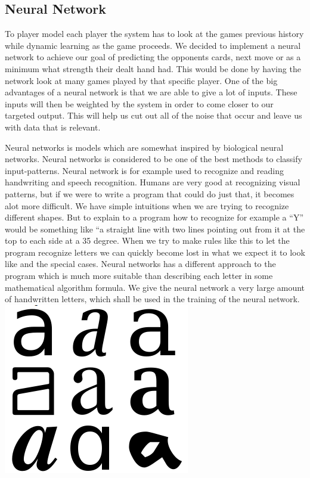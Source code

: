 \subsection{Neural Network}
To player model each player the system has to look at the games previous history while dynamic learning as the game proceeds.
We decided to implement a neural network to achieve our goal of predicting the opponents cards, next move or as a minimum what strength their dealt hand had. This would be done by having the network look at many games played by that specific player.
One of the big advantages of a neural network is that we are able to give a lot of inputs. These inputs will then be weighted by the system in order to come closer to our targeted output.
This will help us cut out all of the noise that occur and leave us with data that is relevant.

Neural networks is models which are somewhat inspired by biological neural networks. Neural networks is considered to be one of the best methods to classify input-patterns. Neural network is for example used to recognize and reading handwriting and speech recognition.
Humans are very good at recognizing visual patterns, but if we were to write a program that could do just that, it becomes alot more difficult. We have simple intuitions when we are trying to recognize different shapes. But to explain to a program how to recognize for example a “Y” would be something like “a straight line with two lines pointing out from it at the top to each side at a 35 degree. When we try to make rules like this to let the program recognize letters we can quickly become lost in what we expect it to look like and the special cases.
Neural networks has a different approach to the program which is much more suitable than describing each letter in some mathematical algorithm formula.
We give the neural network a very large amount of handwritten letters, which shall be used in the training of the neural network.
\includegraphics[scale=0.5]{images/nn.png}

